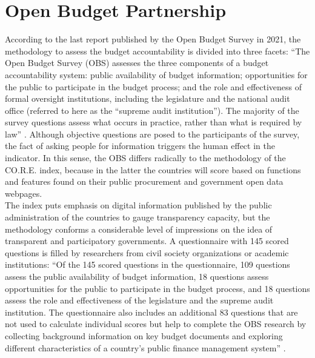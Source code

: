 \documentclass[a4paper, twoside]{report}
\begin{document}
\section*{Open Budget Partnership}

According to the last report published by the Open Budget Survey in 2021, the methodology to assess the budget accountability is divided into three facets: ``The Open Budget Survey (OBS) assesses the three components of a budget accountability system: public availability of budget information; opportunities for the public to participate in the budget process; and the role and effectiveness of formal oversight institutions, including the legislature and the national audit office (referred to here as the “supreme audit institution”). The majority of the survey questions assess what occurs in practice, rather than what is required by law'' \citep[p. 65]{open_budget}. Although objective questions are posed to the participants of the survey, the fact of asking people for information triggers the human effect in the indicator. In this sense, the OBS differs radically to the methodology of the CO.R.E. index, because in the latter the countries will score based on functions and features found on their public procurement and government open data webpages.\\

The index puts emphasis on digital information published by the public administration of the countries to gauge transparency capacity, but the methodology conforms a considerable level of impressions on the idea of transparent and participatory governments. A questionnaire with 145 scored questions is filled by researchers from civil society organizations or academic institutions: ``Of the 145 scored questions in the questionnaire, 109 questions assess the public availability of budget information, 18 questions assess opportunities for the public to participate in the budget process, and 18 questions assess the role and effectiveness of the legislature and the supreme audit institution. The questionnaire also includes an additional 83 questions that are not used to calculate individual scores but help to complete the OBS research by collecting background information on key budget documents and exploring different characteristics of a country’s public finance management system'' \citep[p. 65]{open_budget}.\\
\end{document}
